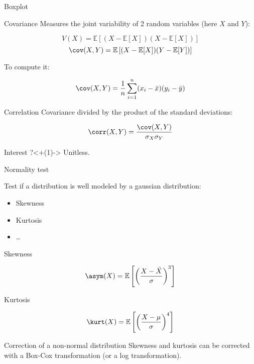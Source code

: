 \begin{frame}{Boxplot}

\end{frame}

\begin{frame}{Covariance}
  Measures the joint variability of 2 random variables (here $X$ and $Y$):

  \[
    V(X) = \mathbb{E}\left[(X - \mathbb{E}[X])(X - \mathbb{E}[X])\right]
  \]
  \[
    \cov(X, Y) = \mathbb{E}\left[(X - \mathbb{E}[X])(Y - \mathbb{E}[Y])\right]
  \]

  To compute it:

  \[
    \cov(X, Y) = \frac{1}{n}\sum_{i = 1}^{n}(x_i - \bar{x})(y_i - \bar{y})
  \]
\end{frame}

\begin{frame}{Correlation}
  Covariance divided by the product of the standard deviations:

  \[
    \corr(X, Y) = \frac{\cov(X, Y)}{\sigma_X\sigma_Y}
  \]

  \alert{Interest ?}\visible<+(1)->{ Unitless.}
\end{frame}

\begin{frame}{Normality test}

  Test if a distribution is well modeled by a gaussian distribution:

  \begin{itemize}
  \item Skewness
  \item Kurtosis
  \item …
  \end{itemize}
\end{frame}

\begin{frame}{Skewness}


  \[
    \asym(X) = \mathbb{E} \left[\left(\frac{X - \bar{X}}{\sigma}\right)^3\right]
  \]
\end{frame}

\begin{frame}{Kurtosis}


  \[
    \kurt(X) = \mathbb{E} \left[\left(\frac{X - \mu}{\sigma}\right)^4\right]
  \]
\end{frame}

\begin{frame}{Correction of a non-normal distribution}
  Skewness and kurtosis can be corrected with a Box-Cox transformation (or a log transformation).
\end{frame}
